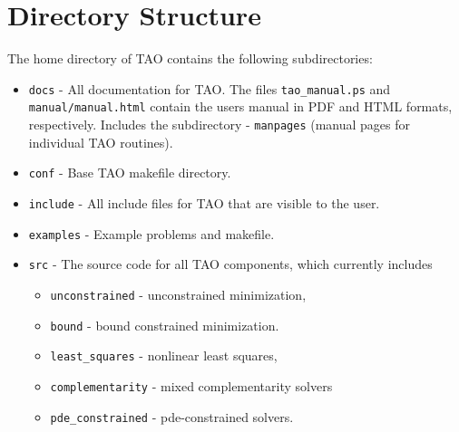 \section{Directory Structure}

The home directory of TAO contains the following subdirectories:

\begin{itemize}
\item \texttt{docs} - All documentation for TAO. The files \texttt{tao\_manual.ps}
                   and \texttt{manual/manual.html} contain the users manual in
                   PDF and HTML formats, respectively. Includes
                   the subdirectory
 \subitem - \texttt{manpages} (manual pages for individual TAO routines).
\item \texttt{conf} - Base TAO makefile directory.  
\item \texttt{include} - All include files for TAO that are visible to the user.
\item \texttt{examples} - Example problems and makefile.
\item \texttt{src} - The source code for all TAO components, which
                  currently includes
 \begin{itemize}
 \item \texttt{unconstrained} - unconstrained minimization,
 \item \texttt{bound} - bound constrained minimization.
 \item \texttt{least\_squares} - nonlinear least squares,
 \item \texttt{complementarity} - mixed complementarity solvers
 \item \texttt{pde\_constrained} - pde-constrained solvers.
 \end{itemize}
\end{itemize}

